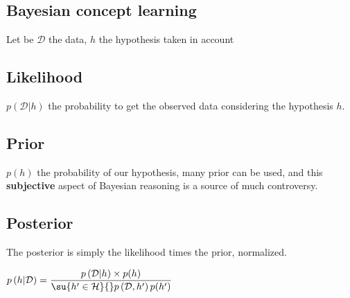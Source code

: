 \subsection{Bayesian concept learning}
Let be $\mathcal{D}$ the data, $h$ the hypothesis taken in account
\subsection{Likelihood}
$p\left(\mathcal{D}|h\right)$ the probability to get the observed data considering the 
hypothesis $h$.
\subsection{Prior}
$p(h)$ the probability of our hypothesis, many prior can be used, and this 
\textbf{subjective} aspect of Bayesian reasoning is a source of much controversy.

\subsection{Posterior}
The posterior is simply the likelihood times the prior, normalized.
\begin{center}
$p\left(h|\mathcal{D}\right) = \dfrac{p\left(\mathcal{D}|h\right)\times p(h)}{
    \su{h'\in\mathcal{H}}{}p\left(\mathcal{D}, h'\right)p(h')
}$
\end{center}

